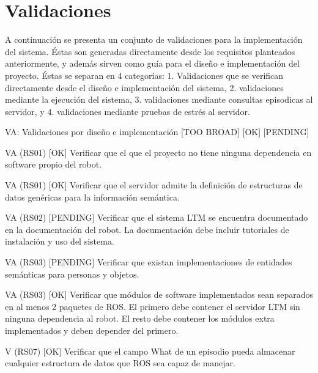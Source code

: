 

\section{Validaciones}

A continuación se presenta un conjunto de validaciones para la implementación del sistema. Éstas son generadas directamente desde los requisitos planteados anteriormente, y además sirven como guía para el diseño e implementación del proyecto. Éstas se separan en 4 categorías: 1. Validaciones que se verifican directamente desde el diseño e implementación del sistema, 2. validaciones mediante la ejecución del sistema, 3. validaciones mediante consultas episodicas al servidor, y 4. validaciones mediante pruebas de estrés al servidor.


VA: Validaciones por diseño e implementación
[TOO BROAD]
[OK]
[PENDING]

VA (RS01) [OK]
Verificar que el que el proyecto no tiene ninguna dependencia en software propio del robot.

VA (RS01) [OK]
Verificar que el servidor admite la definición de estructuras de datos genéricas para la información semántica.

VA (RS02) [PENDING]
Verificar que el sistema LTM se encuentra documentado en la documentación del robot. La documentación debe incluir tutoriales de instalación y uso del sistema.

VA (RS03) [PENDING]
Verificar que existan implementaciones de entidades semánticas para personas y objetos.

VA (RS03) [OK]
Verificar que módulos de software implementados sean separados en al menos 2 paquetes de ROS. El primero debe contener el servidor LTM sin ninguna dependencia al robot. El resto debe contener los módulos extra implementados y deben depender del primero.

V (RS07) [OK]
Verificar que el campo What de un episodio pueda almacenar cualquier estructura de datos que ROS sea capaz de manejar.

